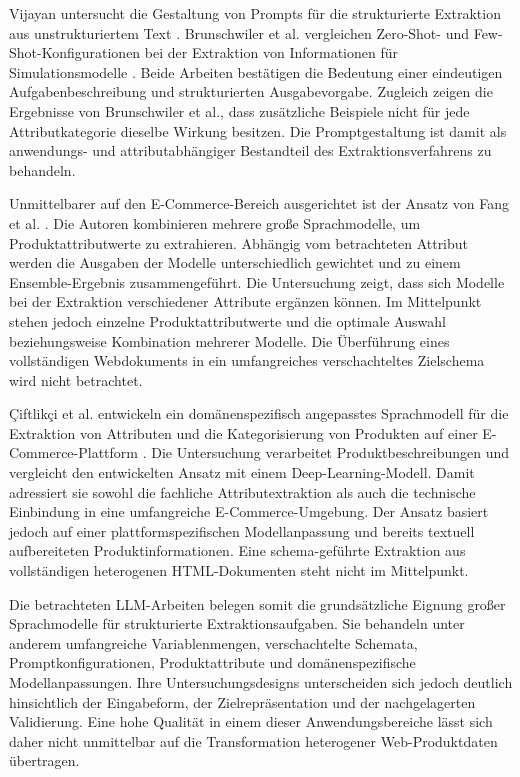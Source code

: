 Vijayan untersucht die Gestaltung von Prompts für die strukturierte Extraktion aus unstrukturiertem Text \cite{vijayan2023prompt}. Brunschwiler et al. 
vergleichen Zero-Shot- und Few-Shot-Konfigurationen bei der Extraktion von Informationen für Simulationsmodelle \cite{brunschwiler2025enhancing}. Beide 
Arbeiten bestätigen die Bedeutung einer eindeutigen Aufgabenbeschreibung und strukturierten Ausgabevorgabe. Zugleich zeigen die Ergebnisse von Brunschwiler et al., 
dass zusätzliche Beispiele nicht für jede Attributkategorie dieselbe Wirkung besitzen. Die Promptgestaltung ist damit als anwendungs- und attributabhängiger 
Bestandteil des Extraktionsverfahrens zu behandeln.

Unmittelbarer auf den E-Commerce-Bereich ausgerichtet ist der Ansatz von Fang et al. \cite{fang2024llmensemble}. Die Autoren kombinieren mehrere große Sprachmodelle, 
um Produktattributwerte zu extrahieren. Abhängig vom betrachteten Attribut werden die Ausgaben der Modelle unterschiedlich gewichtet und zu einem Ensemble-Ergebnis 
zusammengeführt. Die Untersuchung zeigt, dass sich Modelle bei der Extraktion verschiedener Attribute ergänzen können. Im Mittelpunkt stehen jedoch einzelne 
Produktattributwerte und die optimale Auswahl beziehungsweise Kombination mehrerer Modelle. Die Überführung eines vollständigen Webdokuments in ein umfangreiches 
verschachteltes Zielschema wird nicht betrachtet.

Çiftlikçi et al. entwickeln ein domänenspezifisch angepasstes Sprachmodell für die Extraktion von Attributen und die Kategorisierung von Produkten auf einer 
E-Commerce-Plattform \cite{ciftlikci2025attribute}. Die Untersuchung verarbeitet Produktbeschreibungen und vergleicht den entwickelten Ansatz mit einem 
Deep-Learning-Modell. Damit adressiert sie sowohl die fachliche Attributextraktion als auch die technische Einbindung in eine umfangreiche E-Commerce-Umgebung. 
Der Ansatz basiert jedoch auf einer plattformspezifischen Modellanpassung und bereits textuell aufbereiteten Produktinformationen. Eine schema-geführte 
Extraktion aus vollständigen heterogenen HTML-Dokumenten steht nicht im Mittelpunkt.

Die betrachteten LLM-Arbeiten belegen somit die grundsätzliche Eignung großer Sprachmodelle für strukturierte Extraktionsaufgaben. Sie behandeln unter anderem 
umfangreiche Variablenmengen, verschachtelte Schemata, Promptkonfigurationen, Produktattribute und domänenspezifische Modellanpassungen. Ihre Untersuchungsdesigns 
unterscheiden sich jedoch deutlich hinsichtlich der Eingabeform, der Zielrepräsentation und der nachgelagerten Validierung. Eine hohe Qualität in einem dieser 
Anwendungsbereiche lässt sich daher nicht unmittelbar auf die Transformation heterogener Web-Produktdaten übertragen.

